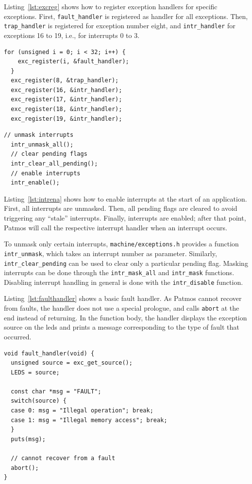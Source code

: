 \documentclass[a4paper,fontsize=10pt,twoside,DIV15,BCOR12mm,headinclude=true,footinclude=false,pagesize,bibtotoc]{scrbook}
\begin{document}
Listing~\ref{lst:excreg} shows how to register exception handlers for
specific exceptions. First, \texttt{fault\_handler} is registered as
handler for all exceptions. Then, \texttt{trap\_handler} is registered
for exception number eight, and \texttt{intr\_handler} for exceptions
16 to 19, i.e., for interrupts 0 to 3.

\begin{lstlisting}[float, caption={Exception handler registration\label{lst:excreg}}]
  for (unsigned i = 0; i < 32; i++) {
	exc_register(i, &fault_handler);
  }
  exc_register(8, &trap_handler);
  exc_register(16, &intr_handler);
  exc_register(17, &intr_handler);
  exc_register(18, &intr_handler);
  exc_register(19, &intr_handler);
\end{lstlisting}

\begin{lstlisting}[float, caption={Interrupt enabling\label{lst:intrena}}]
  // unmask interrupts
  intr_unmask_all();
  // clear pending flags
  intr_clear_all_pending();
  // enable interrupts
  intr_enable();
\end{lstlisting}

Listing~\ref{lst:intrena} shows how to enable interrupts at the start
of an application. First, all interrupts are unmasked. Then, all
pending flags are cleared to avoid triggering any ``stale''
interrupts. Finally, interrupts are enabled; after that point, Patmos
will call the respective interrupt handler when an interrupt occurs.

To unmask only certain interrupts, \texttt{machine/exceptions.h}
provides a function \texttt{intr\_unmask}, which takes an interrupt
number as parameter. Similarly, \texttt{intr\_clear\_pending} can be
used to clear only a particular pending flag. Masking interrupts can
be done through the \texttt{intr\_mask\_all} and \texttt{intr\_mask}
functions. Disabling interrupt handling in general is done with the
\texttt{intr\_disable} function.

Listing~\ref{lst:faulthandler} shows a basic fault handler. As Patmos
cannot recover from faults, the handler does not use a special
prologue, and calls \texttt{abort} at the end instead of returning. In
the function body, the handler displays the exception source on the
leds and prints a message corresponding to the type of fault that
occurred.

\begin{lstlisting}[float, caption={Fault handler example\label{lst:faulthandler}}]
void fault_handler(void) {
  unsigned source = exc_get_source();
  LEDS = source;

  const char *msg = "FAULT";
  switch(source) {
  case 0: msg = "Illegal operation"; break;
  case 1: msg = "Illegal memory access"; break;
  }
  puts(msg);

  // cannot recover from a fault
  abort();
}
\end{lstlisting}
\end{document}
